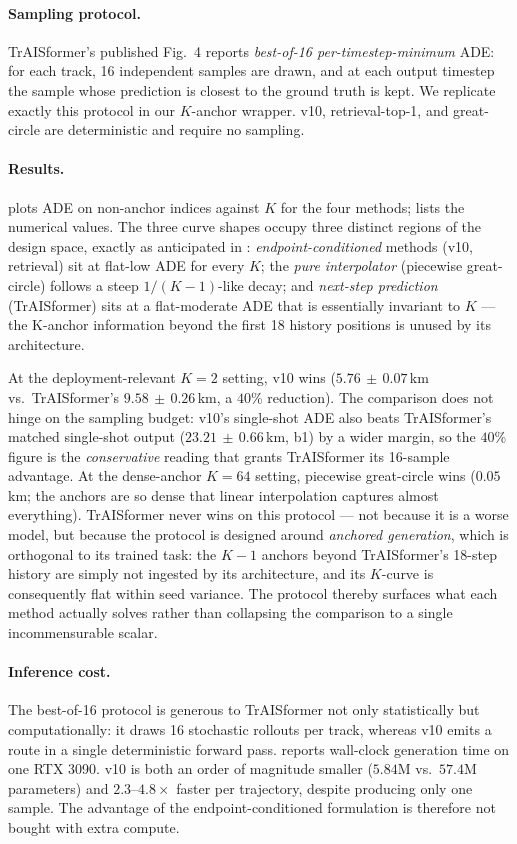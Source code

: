 \documentclass[11pt]{article}
\begin{document}
\paragraph{Sampling protocol.} TrAISformer's published Fig.~4 reports
\emph{best-of-16 per-timestep-minimum} ADE: for each track, 16 independent
samples are drawn, and at each output timestep the sample whose prediction
is closest to the ground truth is kept. We replicate exactly this protocol
in our $K$-anchor wrapper. v10, retrieval-top-1, and great-circle are
deterministic and require no sampling.

\paragraph{Results.}  plots ADE on non-anchor
indices against $K$ for the four methods;  lists
the numerical values. The three curve shapes occupy three distinct regions
of the design space, exactly as anticipated in
: \emph{endpoint-conditioned} methods (v10, retrieval)
sit at flat-low ADE for every $K$; the \emph{pure interpolator}
(piecewise great-circle) follows a steep $1/(K{-}1)$-like decay; and
\emph{next-step prediction} (TrAISformer) sits at a flat-moderate ADE
that is essentially invariant to $K$ --- the K-anchor information beyond
the first 18 history positions is unused by its architecture.

At the deployment-relevant $K=2$ setting, v10 wins ($5.76\,\pm\,0.07$\,km
vs.\ TrAISformer's $9.58\,\pm\,0.26$\,km, a $40$\% reduction). The
comparison does not hinge on the sampling budget: v10's single-shot ADE
also beats TrAISformer's matched single-shot output ($23.21\,\pm\,0.66$\,km,
b1) by a wider margin, so the $40$\% figure is the \emph{conservative}
reading that grants TrAISformer its 16-sample advantage. At the
dense-anchor $K=64$ setting, piecewise great-circle wins ($0.05$\,km;
the anchors are so dense that linear interpolation captures almost
everything). TrAISformer never wins on this protocol --- not because it
is a worse model, but because the protocol is designed around
\emph{anchored generation}, which is orthogonal to its trained task: the
$K-1$ anchors beyond TrAISformer's 18-step history are simply not
ingested by its architecture, and its $K$-curve is consequently flat
within seed variance. The protocol thereby surfaces what each method
actually solves rather than collapsing the comparison to a single
incommensurable scalar.

\paragraph{Inference cost.} The best-of-16 protocol is generous to
TrAISformer not only statistically but computationally: it draws 16
stochastic rollouts per track, whereas v10 emits a route in a single
deterministic forward pass.  reports wall-clock
generation time on one RTX 3090. v10 is both an order of magnitude
smaller ($5.84$M vs.\ $57.4$M parameters) and $2.3$--$4.8\times$ faster
per trajectory, despite producing only one sample. The advantage of the
endpoint-conditioned formulation is therefore not bought with extra
compute.
\end{document}
